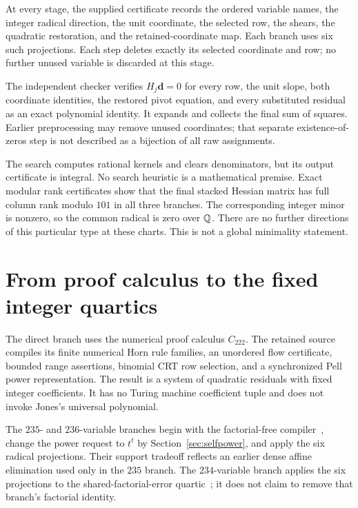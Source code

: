 At every stage, the supplied certificate records the ordered variable
names, the integer radical direction, the unit coordinate, the selected
row, the shears, the quadratic restoration, and the retained-coordinate
map. Each branch uses six such projections. Each step deletes exactly
its selected coordinate and row; no further unused variable is discarded
at this stage.

The independent checker verifies $H_j\boldsymbol d=0$ for every row,
the unit slope, both coordinate identities, the restored pivot equation,
and every substituted residual as an exact polynomial identity.
It expands and collects the final sum of squares. Earlier preprocessing
may remove unused coordinates; that separate existence-of-zeros step
is not described as a bijection of all raw assignments.

The search computes rational kernels and clears denominators, but its
output certificate is integral. No search heuristic is a mathematical
premise. Exact modular rank certificates show that the final stacked
Hessian matrix has full column rank modulo $101$ in all three branches.
The corresponding integer minor is nonzero, so the common radical is
zero over $\mathbb Q$. There are no further directions of this particular type
at these charts. This is not a global minimality statement.

\section{From proof calculus to the fixed integer quartics}

The direct branch uses the numerical proof calculus $C_{222}$. The
retained source compiles its finite numerical Horn rule families, an
unordered flow certificate, bounded range assertions, binomial CRT
row selection, and a synchronized Pell power representation. The
result is a system of quadratic residuals with fixed integer coefficients.
It has no Turing machine coefficient tuple and does not invoke Jones's
universal polynomial.

The $235$- and $236$-variable branches begin with the factorial-free
compiler~\cite{factorialfree}, change the power request to $t^t$ by
Section~\ref{sec:selfpower}, and apply the six radical projections.
Their support tradeoff reflects an earlier dense affine elimination
used only in the $235$ branch. The $234$-variable branch applies the
six projections to the shared-factorial-error quartic~\cite{sharederror};
it does not claim to remove that branch's factorial identity.

